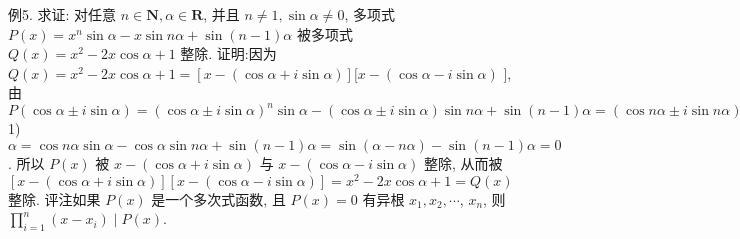 例5. 求证: 对任意 $n \in \mathbf{N}, \alpha \in \mathbf{R}$, 并且 $n \neq 1, \sin \alpha \neq 0$, 多项式 $P(x)= x^n \sin \alpha-x \sin n \alpha+\sin (n-1) \alpha$ 被多项式 $Q(x)=x^2-2 x \cos \alpha+1$ 整除.
证明:因为 $Q(x)=x^2-2 x \cos \alpha+1=[x-(\cos \alpha+i \sin \alpha)][x- (\cos \alpha-i \sin \alpha)$ ], 由 $P(\cos \alpha \pm i \sin \alpha)=(\cos \alpha \pm i \sin \alpha)^n \sin \alpha-(\cos \alpha \pm i \sin \alpha) \sin n \alpha+\sin (n-1) \alpha=(\cos n \alpha \pm i \sin n \alpha) \sin \alpha-(\cos \alpha \pm i \sin \alpha) \sin n \alpha+\sin (n-$ 1) $\alpha=\cos n \alpha \sin \alpha-\cos \alpha \sin n \alpha+\sin (n-1) \alpha=\sin (\alpha-n \alpha)-\sin (n-1) \alpha=0$.
所以 $P(x)$ 被 $x-(\cos \alpha+i \sin \alpha)$ 与 $x-(\cos \alpha-i \sin \alpha)$ 整除, 从而被 $[x- (\cos \alpha+i \sin \alpha)][x-(\cos \alpha-i \sin \alpha)]=x^2-2 x \cos \alpha+1=Q(x)$ 整除.
评注如果 $P(x)$ 是一个多次式函数, 且 $P(x)=0$ 有异根 $x_1, x_2, \cdots$, $x_n$, 则 $\prod_{i=1}^n\left(x-x_i\right) \mid P(x)$.




